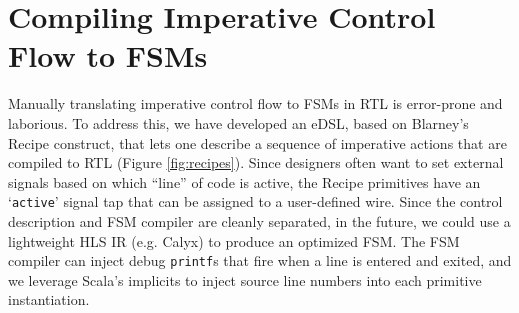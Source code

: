 \documentclass[sigplan,review,nonacm,9pt]{acmart}
\begin{document}


%
%

\section{Compiling Imperative Control Flow to FSMs}

Manually translating imperative control flow to FSMs in RTL is error-prone and laborious.
To address this, we have developed an eDSL\cite{chisel_recipes}, based on Blarney's Recipe construct\cite{blarney}, that lets one describe a sequence of imperative actions that are compiled to RTL (Figure \ref{fig:recipes}).
Since designers often want to set external signals based on which ``line'' of code is active, the Recipe primitives have an `\texttt{active}' signal tap that can be assigned to a user-defined wire.
Since the control description and FSM compiler are cleanly separated, in the future, we could use a lightweight HLS IR (e.g. Calyx\cite{calyx}) to produce an optimized FSM.
The FSM compiler can inject debug \texttt{printf}s that fire when a line is entered and exited, and we leverage Scala's implicits\cite{sourcecode} to inject source line numbers into each primitive instantiation.
\end{document}
